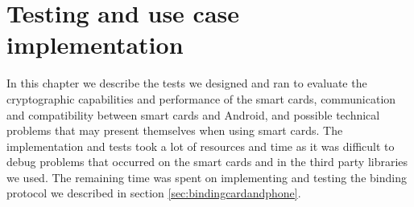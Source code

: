 \chapter{Testing and use case implementation}
\label{ch:testing}
In this chapter we describe the tests we designed and ran to evaluate the cryptographic capabilities and performance of the smart cards, communication and compatibility between smart cards and Android, and possible technical problems that may present themselves when using smart cards. The implementation and tests took a lot of resources and time as it was difficult to debug problems that occurred on the smart cards and in the third party libraries we used. The remaining time was spent on implementing and testing the binding protocol we described in section \ref{sec:bindingcardandphone}.








